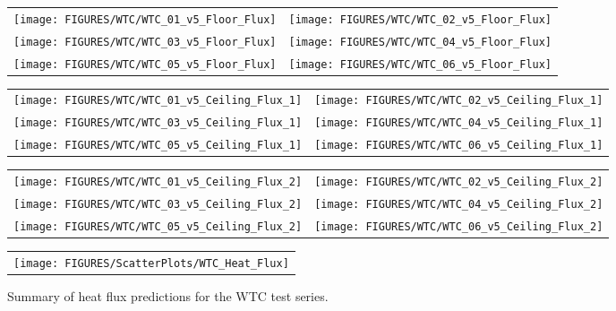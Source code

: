 \begin{figure}[p]
\begin{tabular*}{\textwidth}{l@{\extracolsep{\fill}}r}
\texttt{[image: FIGURES/WTC/WTC\_01\_v5\_Floor\_Flux]} &
\texttt{[image: FIGURES/WTC/WTC\_02\_v5\_Floor\_Flux]} \\
\texttt{[image: FIGURES/WTC/WTC\_03\_v5\_Floor\_Flux]} &
\texttt{[image: FIGURES/WTC/WTC\_04\_v5\_Floor\_Flux]} \\
\texttt{[image: FIGURES/WTC/WTC\_05\_v5\_Floor\_Flux]} &
\texttt{[image: FIGURES/WTC/WTC\_06\_v5\_Floor\_Flux]}
\end{tabular*}
\label{NIST_WTC_Floor_Flux}
\end{figure}

\begin{figure}[p]
\begin{tabular*}{\textwidth}{l@{\extracolsep{\fill}}r}
\texttt{[image: FIGURES/WTC/WTC\_01\_v5\_Ceiling\_Flux\_1]} &
\texttt{[image: FIGURES/WTC/WTC\_02\_v5\_Ceiling\_Flux\_1]} \\
\texttt{[image: FIGURES/WTC/WTC\_03\_v5\_Ceiling\_Flux\_1]} &
\texttt{[image: FIGURES/WTC/WTC\_04\_v5\_Ceiling\_Flux\_1]} \\
\texttt{[image: FIGURES/WTC/WTC\_05\_v5\_Ceiling\_Flux\_1]} &
\texttt{[image: FIGURES/WTC/WTC\_06\_v5\_Ceiling\_Flux\_1]}
\end{tabular*}
\label{NIST_WTC_Ceiling_Flux_1}
\end{figure}

\begin{figure}[p]
\begin{tabular*}{\textwidth}{l@{\extracolsep{\fill}}r}
\texttt{[image: FIGURES/WTC/WTC\_01\_v5\_Ceiling\_Flux\_2]} &
\texttt{[image: FIGURES/WTC/WTC\_02\_v5\_Ceiling\_Flux\_2]} \\
\texttt{[image: FIGURES/WTC/WTC\_03\_v5\_Ceiling\_Flux\_2]} &
\texttt{[image: FIGURES/WTC/WTC\_04\_v5\_Ceiling\_Flux\_2]} \\
\texttt{[image: FIGURES/WTC/WTC\_05\_v5\_Ceiling\_Flux\_2]} &
\texttt{[image: FIGURES/WTC/WTC\_06\_v5\_Ceiling\_Flux\_2]}
\end{tabular*}
\label{NIST_WTC_Ceiling_Flux_2}
\end{figure}

\begin{figure}[p]
\begin{center}
\begin{tabular}{c}
\texttt{[image: FIGURES/ScatterPlots/WTC\_Heat\_Flux]}
\end{tabular}
\end{center}
\caption[Summary of heat flux predictions, WTC test series.]
{Summary of heat flux predictions for the WTC test series.}
\end{figure}



